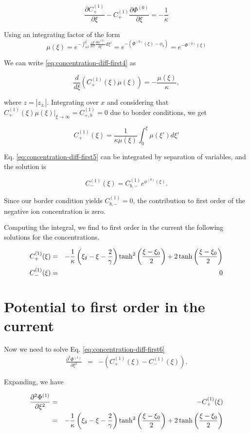 $$\frac{\partial C^{(1)}_+}{\partial \xi}-C^{(1)}_+\frac{\partial \Phi^{(0)}}{\partial \xi} = -\frac{1}{\kappa}$$

Using an integrating factor of the form
$$\mu(\xi)=e^{-\int_{\kappa\delta}^\xi \frac{zF}{RT}\frac{d\phi^{(0)}}{d\xi'}d\xi'}=e^{- (\Phi^{(0)}(\xi)-\phi_b)} = e^{-\Phi^{(0)}(\xi)}$$

We can write \ref{eq:concentration-diff-first4}  as

$$\frac{d}{d\xi}\left(C^{(1)}_+(\xi)\mu(\xi) \right)=-\frac{\mu(\xi)}{\kappa},$$

where $z=|z_\pm|$. Integrating over $x$ and considering that $C^{(1)}_+(\xi)\mu(\xi)\big|_{\xi \rightarrow \infty} = C^{(1)}_{+,b} = 0$ due to border conditions, we get

$$C^{(1)}_+(\xi) =\frac{1}{\kappa\mu(\xi)}\int_{0}^{\xi}\mu(\xi')d\xi'$$

Eq. \ref{eq:concentration-diff-first5} can be integrated by separation of variables, and the solution is 

$$C^{(1)}_-(\xi) = C^{(1)}_{b,-}e^{\phi^{(0)}(\xi)}.$$

Since our border condition yields $ C^{(1)}_{b,-} = 0$, the contribution to first order of the negative ion concentration is zero. 

Computing the integral, we find to first order in the current the following solutions for the concentrations.

\begin{eqnarray}
C^{(1)}_+(\xi) &=& -\frac{1}{\kappa} \left({\xi_\delta-\xi-\frac{2}{\gamma}}\right)\tanh^2\left({\frac{\xi-\xi_0}{2}}\right)+2\tanh\left({\frac{\xi-\xi_0}{2}}\right)\\
C^{(1)}_-(\xi) &=& 0
\label{eq:firstordersol}
\end{eqnarray}



\section{Potential to first order in the current}

Now we need to solve Eq. \ref{eq:concentration-diff-first6}
\begin{eqnarray}
\frac{\partial^2  \Phi^{(1)}}{\partial \xi^2} &=& -(C^{(1)}_{+}(\xi)-C^{(1)}_{-}(\xi)).
\end{eqnarray}

Expanding, we have 

\begin{eqnarray}\nonumber
\frac{\partial^2  \Phi^{(1)}}{\partial \xi^2} &=& -C^{(1)}_{+}(\xi)\\
&=& -\frac{1}{\kappa} \left({\xi_\delta-\xi-\frac{2}{\gamma}}\right)\tanh^2\left({\frac{\xi-\xi_0}{2}}\right)+2\tanh\left({\frac{\xi-\xi_0}{2}}\right)
\end{eqnarray}



